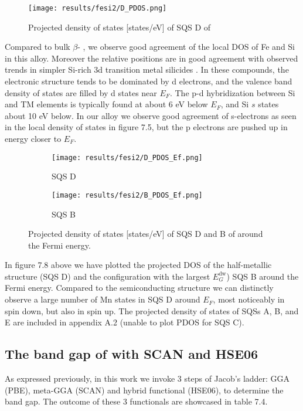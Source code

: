 \begin{figure}[H]
	\centering
	\texttt{[image: results/fesi2/D\_PDOS.png]}
	\caption{Projected density of states [states/eV] of SQS D of }
\end{figure} 

Compared to bulk $\beta$- \cite{doi:10.1063/1.346415}, we observe good agreement of the local DOS of Fe and Si in this alloy. Moreover the relative positions are in good agreement with observed trends in simpler Si-rich 3d transition metal silicides \cite{lange1997electronic}. In these compounds, the electronic structure tends to be dominated by d electrons, and the valence band density of states are filled by d states near $E_F$. The p-d hybridization between Si and TM elements is typically found at about 6 eV below $E_F$, and Si $s$ states about 10 eV below. In our alloy we observe good agreement of s-electrons as seen in the local density of states in figure 7.5, but the p electrons are pushed up in energy closer to $E_F$. 

\begin{figure}[H]
	\begin{subfigure}{.5\textwidth}
			\texttt{[image: results/fesi2/D\_PDOS\_Ef.png]}
			\caption{SQS D}		
	\end{subfigure}
	\begin{subfigure}{.5\textwidth}
		\texttt{[image: results/fesi2/B\_PDOS\_Ef.png]}
		\caption{SQS B}		
	\end{subfigure}
	\caption{Projected density of states [states/eV] of SQS D and B of  around the Fermi energy.}
\end{figure}

In figure 7.8 above we have plotted the projected DOS of the half-metallic structure (SQS D) and the configuration with the largest $E_G ^\text{dw}$) SQS B around the Fermi energy. Compared to the semiconducting structure we can distinctly observe a large number of Mn states in SQS D around $E_F$, most noticeably in spin down, but also in spin up. The projected density of states of SQSs A, B, and E are included in appendix A.2 (unable to plot PDOS for SQS C).

\subsection{The band gap of  with SCAN and HSE06}
As expressed previously, in this work we invoke 3 steps of Jacob's ladder: GGA (PBE), meta-GGA (SCAN) and hybrid functional (HSE06), to determine the band gap. The outcome of these 3 functionals are showcased in table 7.4.


